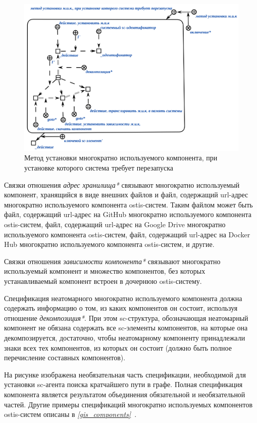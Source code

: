 \begin{figure}[H]
	\includegraphics[scale=0.6]{author/part5/figures/install_with_reboot_method.png}
	\caption{Метод установки многократно используемого компонента, при установке которого система требует перезапуска}
	\label{fig:install_with_reboot_method}
\end{figure}


Связки отношения \textit{адрес хранилища*} связывают многократно используемый компонент, хранящийся в виде внешних файлов и файл, содержащий url-адрес многократно используемого компонента ostis-систем. Таким файлом может быть файл, содержащий url-адрес на GitHub многократно используемого компонента ostis-систем, файл, содержащий url-адрес на Google Drive многократно используемого компонента ostis-систем, файл, содержащий url-адрес на Docker Hub многократно используемого компонента ostis-систем, и другие.

Связки отношения \textit{зависимости компонента*} связывают многократно используемый компонент и множество компонентов, без которых устанавливаемый компонент  встроен в дочернюю ostis-систему.

Спецификация неатомарного многократно используемого компонента должна содержать информацию о том, из каких компонентов он состоит, используя отношение \textit{декомпозиция*}. При этом sc-структура, обозначающая неатомарный компонент не обязана содержать все sc-элементы компонентов, на которые она декомпозируется, достаточно, чтобы неатомарному компоненту принадлежали знаки всех тех компонентов, из которых он состоит (должно быть полное перечисление составных компонентов).

На рисунке \textit{} изображена необязательная часть спецификации, необходимой для установки sc-агента поиска кратчайшего пути в графе. Полная спецификация компонента является результатом объединения обязательной и необязательной частей. Другие примеры спецификаций многократно используемых компонентов ostis-систем описаны в \textit{\ref{gis_components}~}.

